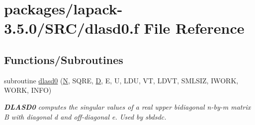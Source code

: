 \hypertarget{dlasd0_8f}{}\section{packages/lapack-\/3.5.0/\+S\+R\+C/dlasd0.f File Reference}
\label{dlasd0_8f}
\subsection*{Functions/\+Subroutines}
\begin{DoxyCompactItemize}
\item 
subroutine \hyperlink{group__auxOTHERauxiliary_gae17e31eb66deb0c5111275edbd302758}{dlasd0} (\hyperlink{polmisc_8c_a0240ac851181b84ac374872dc5434ee4}{N}, S\+Q\+R\+E, \hyperlink{odrpack_8h_a7dae6ea403d00f3687f24a874e67d139}{D}, E, U, L\+D\+U, V\+T, L\+D\+V\+T, S\+M\+L\+S\+I\+Z, I\+W\+O\+R\+K, W\+O\+R\+K, I\+N\+F\+O)
\begin{DoxyCompactList}\small\item\em {\bfseries D\+L\+A\+S\+D0} computes the singular values of a real upper bidiagonal n-\/by-\/m matrix B with diagonal d and off-\/diagonal e. Used by sbdsdc. \end{DoxyCompactList}\end{DoxyCompactItemize}
